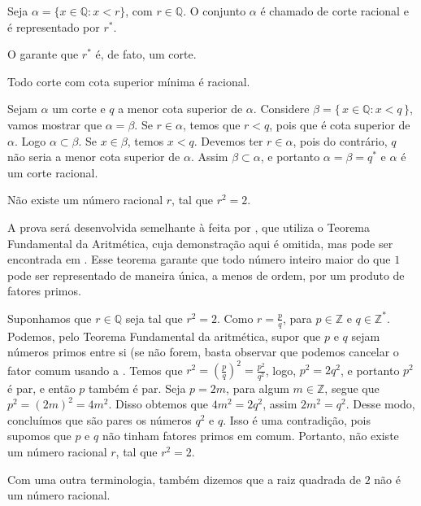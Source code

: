 \documentclass[../main.tex]{subfiles}
\begin{document}
\begin{defi}
    Seja $\alpha = \{ x \in \mathbb{Q} : x < r \}$, com $r \in \mathbb{Q}$. O conjunto $\alpha$ é chamado de corte racional e é representado por $r^*$.
\end{defi}

\begin{obs}
    O  garante que $r^*$ é, de fato, um corte.
\end{obs}

\begin{teo}
    Todo corte com cota superior mínima é racional.
\end{teo}
\begin{dem}
    Sejam $\alpha$ um corte e $q$ a menor cota superior de $\alpha$. Considere $\beta = \{\, x \in \mathbb{Q} : x < q \,\}$, vamos mostrar que $\alpha = \beta$.
    Se $r \in \alpha$, temos que $r < q$, pois que é cota superior de $\alpha$. Logo $\alpha \subset \beta$. Se $x \in \beta$, temos $x < q$. Devemos ter $r \in \alpha$, pois do contrário, $q$ não seria a menor cota superior de $\alpha$. Assim $\beta \subset \alpha$, e portanto $\alpha = \beta = q^*$ e $\alpha$ é um corte racional.
\end{dem}

\begin{prop}\label{reais-prop-raizQuadradaDoisIrracional}
    Não existe um número racional $r$, tal que $r^2 = 2$.
\end{prop}
\begin{dem}
    A prova será desenvolvida semelhante à feita por \textcite{alfeld}, que utiliza o Teorema Fundamental da Aritmética, cuja demonstração aqui é omitida, mas pode ser encontrada em \textcite[p. 9]{santos}. Esse teorema garante que todo número inteiro maior do que $1$ pode ser representado de maneira única, a menos de ordem, por um produto de fatores primos.    
    
    Suponhamos que $r \in \mathbb{Q}$ seja tal que $r^2 = 2$. Como $r = \frac{p}{q}$, para $p \in \mathbb{Z}$ e $q \in \mathbb{Z}^*$. Podemos, pelo Teorema Fundamental da aritmética, supor que $p$ e $q$ sejam números primos entre si (se não forem, basta observar que podemos cancelar o fator comum usando a . Temos que $r^2 = \left( \frac{p}{q} \right)^2 = \frac{p^2}{q^2}$, logo, $p^2 = 2q^2$, e portanto $p^2$ é par, e então $p$ também é par. Seja $p = 2m$, para algum $m \in \mathbb{Z}$, segue que $p^2= (2m)^2 = 4m^2$. Disso obtemos que $4m^2 = 2q^2$, assim $2m^2 = q^2$. Desse modo, concluímos que são pares os números $q^2$ e $q$. Isso é uma contradição, pois supomos que $p$ e $q$ não tinham fatores primos em comum. Portanto, não existe um número racional $r$, tal que $r^2 = 2$.

    Com uma outra terminologia, também dizemos que a raiz quadrada de $2$ não é um número racional.
\end{dem}
\end{document}
